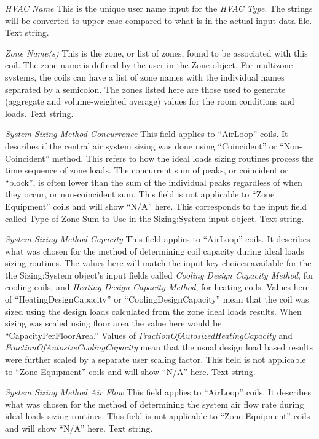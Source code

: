 \emph{HVAC Name} This is the unique user name input for the \emph{HVAC Type}.  The strings  will be converted to upper case compared to what is in the actual input data file.  Text string.

\emph{Zone Name(s)} This is the zone, or list of zones, found to be associated with this coil.  The zone name is defined by the user in the Zone object.  For multizone systems, the coils can have a list of zone names with the individual names separated by a semicolon. The zones listed here are those used to generate (aggregate and volume-weighted average) values for the room conditions and loads. Text string. 

\emph{System Sizing Method Concurrence} This field applies to ``AirLoop'' coils.  It describes if the central air system sizing was done using ``Coincident'' or ``Non-Coincident'' method. This refers to how the ideal loads sizing routines process the time sequence of zone loads.  The concurrent sum of peaks, or coincident or ``block'', is often lower than the sum of the individual peaks regardless of when they occur, or non-coincident sum.  This field is not applicable to ``Zone Equipment'' coils and will show ``N/A'' here.  This corresponds to the input field called Type of Zone Sum to Use in the Sizing:System input object. Text string.

\emph{System Sizing Method Capacity} This field applies to ``AirLoop'' coils.  It describes what was chosen for the method of determining coil capacity during ideal loads sizing routines. The values here will match the input key choices available for the the Sizing:System object's input fields called \emph{Cooling Design Capacity Method}, for cooling coils, and \emph{Heating Design Capacity Method}, for heating coils. Values here of ``HeatingDesignCapacity'' or ``CoolingDesignCapacity'' mean that the coil was sized using the design loads calculated from the zone ideal loads results. When sizing was scaled using floor area the value here would be ``CapacityPerFloorArea.''  Values of \emph{FractionOfAutosizedHeatingCapacity} and \emph{FractionOfAutosizeCoolingCapacity} mean that the usual design load based results were further scaled by a separate user scaling factor. This field is not applicable to ``Zone Equipment'' coils and will show ``N/A'' here. Text string.

\emph{System Sizing Method Air Flow} This field applies to ``AirLoop'' coils.  It describes what was chosen for the method of determining the system air flow rate during ideal loads sizing routines. This field is not applicable to ``Zone Equipment'' coils and will show ``N/A'' here. Text string.


